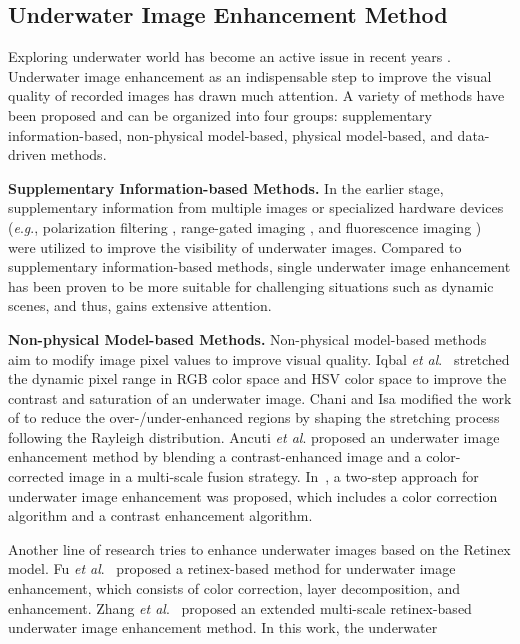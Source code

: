 \documentclass[journal]{IEEEtran}
\newcommand{\etal}{\textit{et al}.}
\newcommand{\eg}{\textit{e}.\textit{g}.}
\begin{document}
\subsection{Underwater Image Enhancement Method}
Exploring underwater world has become an active issue in recent years \cite{Schettini2010,Han2018,Cui2017}. Underwater image enhancement as an indispensable step to improve the visual quality of recorded images has drawn much attention.  A variety of methods have been proposed and can be organized into four groups: supplementary information-based, non-physical model-based, physical model-based, and data-driven methods.

\noindent
\textbf{Supplementary Information-based Methods.} In the earlier stage, supplementary information from multiple images \cite{Narasimhan2003} or specialized hardware devices (\eg, polarization filtering \cite{Shashar1998,Schechner2004,Schechner2005,Treibitz2009}, range-gated imaging \cite{Tan2005,Li2009}, and fluorescence imaging \cite{Treibitz2012,Murez2015}) were utilized to improve the visibility of underwater images. Compared to supplementary information-based methods, single underwater image enhancement has been proven to be more suitable for challenging situations such as dynamic scenes, and thus, gains extensive attention.

\noindent
\textbf{Non-physical Model-based Methods.} Non-physical model-based methods aim to modify image pixel values to improve visual quality. Iqbal \etal~\cite{Iqbal2010} stretched the dynamic pixel range in RGB color space and HSV color space to improve the contrast and saturation of an underwater image.
Chani and Isa \cite{Ghani2015,Ghani20152} modified the work of \cite{Iqbal2010} to reduce the over-/under-enhanced regions by shaping the stretching process following the Rayleigh distribution.
Ancuti \etal \cite{Ancuti2012} proposed an underwater image enhancement method by blending a contrast-enhanced image and a color-corrected image in a multi-scale fusion strategy.
In~\cite{Fu2017}, a two-step approach for underwater image enhancement was proposed, which includes a color correction algorithm and a contrast enhancement algorithm.


Another line of research tries to enhance underwater images based on the Retinex model.
Fu \etal~\cite{Fu2014} proposed a retinex-based method for underwater image enhancement, which consists of color correction, layer decomposition, and enhancement.
Zhang \etal~\cite{Zhang2017Neuro} proposed an extended multi-scale retinex-based underwater image enhancement method. In this work, the underwater
\end{document}
